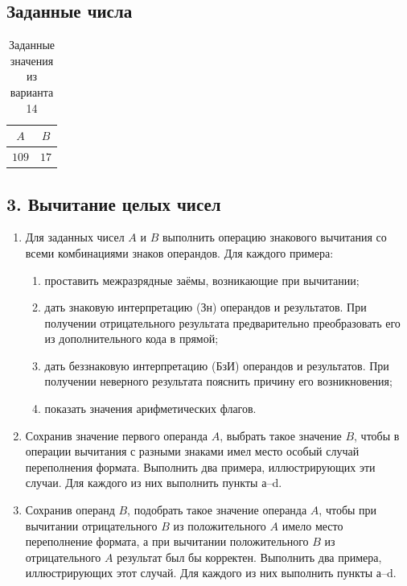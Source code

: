 \subsection*{Заданные числа}

\begin{table}[H]
    \centering
    \caption{Заданные значения из варианта 14}
    \begin{tabular}{|c|c|}
		$A$ & $B$ \\
		\hline
		$109$ & $17$  \\
		
    \end{tabular}
\end{table}



\subsection*{3. Вычитание целых чисел}

\begin{enumerate}
    \item Для заданных чисел $A$ и $B$ выполнить операцию знакового
    вычитания со всеми комбинациями знаков операндов. Для каждого
    примера:
    \begin{enumerate}
        \item проставить межразрядные заёмы, возникающие при вычитании;
        \item дать знаковую интерпретацию (Зн) операндов и результатов.
        При получении отрицательного результата предварительно
        преобразовать его из дополнительного кода в прямой;
        \item дать беззнаковую интерпретацию (БзИ) операндов и
        результатов. При получении неверного результата пояснить
        причину его возникновения;
        \item показать значения арифметических флагов.
    \end{enumerate}

    \item Сохранив значение первого операнда $A$, выбрать такое
    значение $B$, чтобы в операции вычитания с разными знаками имел
    место особый случай переполнения формата. Выполнить два примера,
    иллюстрирующих эти случаи. Для каждого из них выполнить пункты а--d.

    \item Сохранив операнд $B$, подобрать такое значение операнда $A$,
    чтобы при вычитании отрицательного $B$ из положительного $A$ имело
    место переполнение формата, а при вычитании положительного $B$ из
    отрицательного $A$ результат был бы корректен. Выполнить два
    примера, иллюстрирующих этот случай. Для каждого из них выполнить
    пункты а--d.
\end{enumerate}

